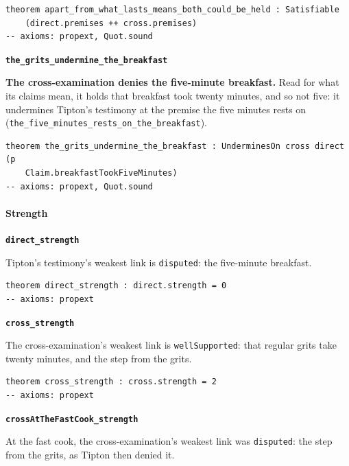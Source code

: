 \documentclass[11pt]{article}
\begin{document}
{\small\begin{verbatim}
theorem apart_from_what_lasts_means_both_could_be_held : Satisfiable
    (direct.premises ++ cross.premises)
-- axioms: propext, Quot.sound
\end{verbatim}}
\par\medskip\noindent\textbf{\texttt{the\_\allowbreak{}grits\_\allowbreak{}undermine\_\allowbreak{}the\_\allowbreak{}breakfast}}\par\nobreak\noindent
\textbf{The cross-examination denies the five-minute breakfast.} Read for what its claims mean, it holds that breakfast took twenty minutes, and so not five: it undermines Tipton’s testimony at the premise the five minutes rests on (\texttt{the\_\allowbreak{}five\_\allowbreak{}minutes\_\allowbreak{}rests\_\allowbreak{}on\_\allowbreak{}the\_\allowbreak{}breakfast}).

{\small\begin{verbatim}
theorem the_grits_undermine_the_breakfast : UnderminesOn cross direct (p
    Claim.breakfastTookFiveMinutes)
-- axioms: propext, Quot.sound
\end{verbatim}}
\paragraph*{Strength}
\leavevmode\par\nobreak
\par\medskip\noindent\textbf{\texttt{direct\_\allowbreak{}strength}}\par\nobreak\noindent
Tipton’s testimony’s weakest link is \texttt{disputed}: the five-minute breakfast.

{\small\begin{verbatim}
theorem direct_strength : direct.strength = 0
-- axioms: propext
\end{verbatim}}
\par\medskip\noindent\textbf{\texttt{cross\_\allowbreak{}strength}}\par\nobreak\noindent
The cross-examination’s weakest link is \texttt{well\allowbreak{}Supported}: that regular grits take twenty minutes, and the step from the grits.

{\small\begin{verbatim}
theorem cross_strength : cross.strength = 2
-- axioms: propext
\end{verbatim}}
\par\medskip\noindent\textbf{\texttt{cross\allowbreak{}At\allowbreak{}The\allowbreak{}Fast\allowbreak{}Cook\_\allowbreak{}strength}}\par\nobreak\noindent
At the fast cook, the cross-examination’s weakest link was \texttt{disputed}: the step from the grits, as Tipton then denied it.
\end{document}
